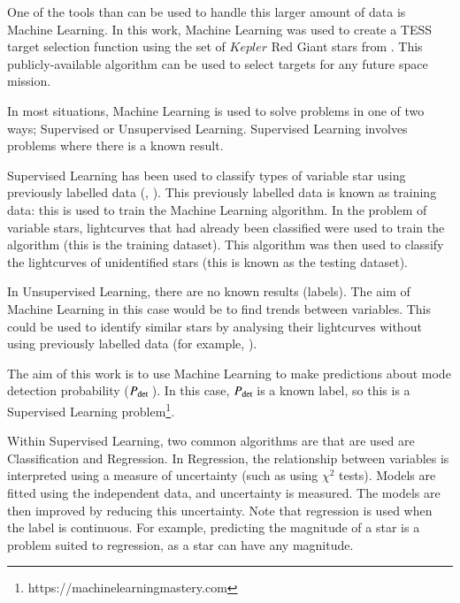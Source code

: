 \documentclass[a4paper,fleqn,usenatbib,useAMS]{mnras}
\newcommand{\pdet}{\ensuremath{P_{\rm det}\:}}
\begin{document}

One of the tools than can be used to handle this larger amount of data is Machine Learning. In this work, Machine Learning was used to create a TESS target selection function using the set of $Kepler$ Red Giant stars from \citet{davies_asteroseismology_2016}. This publicly-available algorithm can be used to select targets for any future space mission.

In most situations, Machine Learning is used to solve problems in one of two ways; Supervised or Unsupervised Learning. Supervised Learning involves problems where there is a known result. 

Supervised Learning has been used to classify types of variable star using previously labelled data (\citet{nun_supervised_2014}, \citet{elorrieta_machine_2016}). This previously labelled data is known as training data: this is used to train the Machine Learning algorithm. In the problem of variable stars, lightcurves that had already been classified were used to train the algorithm (this is the training dataset). This algorithm was then used to classify the lightcurves of unidentified stars (this is known as the testing dataset).

In Unsupervised Learning, there are no known results (labels). The aim of Machine Learning in this case would be to find trends between variables. This could be used to identify similar stars by analysing their lightcurves without using previously labelled data (for example, \citet{valenzuela_unsupervised_2018}).

The aim of this work is to use Machine Learning to make predictions about mode detection probability (\pdet). In this case, \pdet is a known label, so this is a Supervised Learning problem\footnote{https://machinelearningmastery.com}.

Within Supervised Learning, two common algorithms are that are used are Classification and Regression. In Regression, the relationship between variables is interpreted using a measure of uncertainty (such as using $\chi^{2}$ tests). Models are fitted using the independent data, and uncertainty is measured. The models are then improved by reducing this uncertainty. Note that regression is used when the label is continuous. For example, predicting the magnitude of a star is a problem suited to regression, as a star can have any magnitude.
\end{document}
